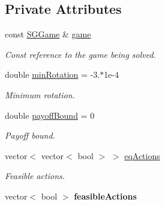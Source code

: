 \subsection*{Private Attributes}
\begin{DoxyCompactItemize}
\item 
\mbox{\label{classSGSolver__MaxMinMax__GRB_a255f5b992318f32044437144456cc3f2}} 
const \hyperlink{classSGGame}{S\+G\+Game} \& \hyperlink{classSGSolver__MaxMinMax__GRB_a255f5b992318f32044437144456cc3f2}{game}
\begin{DoxyCompactList}\small\item\em Const reference to the game being solved. \end{DoxyCompactList}\item 
\mbox{\label{classSGSolver__MaxMinMax__GRB_a1e9f4d61d5fdf270b6e73d5b490f412d}} 
double \hyperlink{classSGSolver__MaxMinMax__GRB_a1e9f4d61d5fdf270b6e73d5b490f412d}{min\+Rotation} = -\/3.$\ast$1e-\/4
\begin{DoxyCompactList}\small\item\em Minimum rotation. \end{DoxyCompactList}\item 
\mbox{\label{classSGSolver__MaxMinMax__GRB_a0f392ec79175ee7196cbac9997a9c6a2}} 
double \hyperlink{classSGSolver__MaxMinMax__GRB_a0f392ec79175ee7196cbac9997a9c6a2}{payoff\+Bound} = 0
\begin{DoxyCompactList}\small\item\em Payoff bound. \end{DoxyCompactList}\item 
\mbox{\label{classSGSolver__MaxMinMax__GRB_ac18a54a857000d450af1cc3bb3ae2875}} 
vector$<$ vector$<$ bool $>$ $>$ \hyperlink{classSGSolver__MaxMinMax__GRB_ac18a54a857000d450af1cc3bb3ae2875}{eq\+Actions}
\begin{DoxyCompactList}\small\item\em Feasible actions. \end{DoxyCompactList}\item 
\mbox{\label{classSGSolver__MaxMinMax__GRB_af0cede224a1af4e468ab07d0703dad52}} 
vector$<$ bool $>$ {\bfseries feasible\+Actions}

\end{DoxyCompactItemize}

